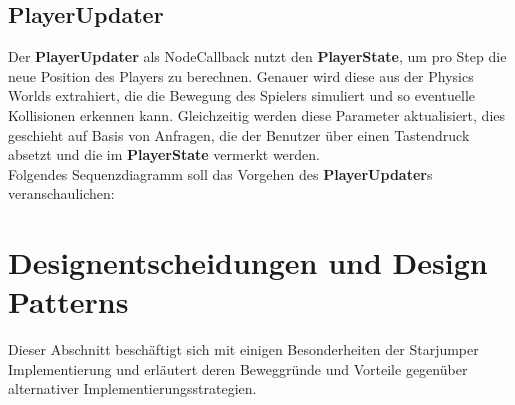 \documentclass{llncs}
\begin{document}
\subsection{PlayerUpdater}
Der \textbf{PlayerUpdater} als NodeCallback nutzt den \textbf{PlayerState}, um pro Step die neue Position des Players
zu berechnen. Genauer wird diese aus der Physics Worlds extrahiert, die die Bewegung des Spielers simuliert und so
eventuelle Kollisionen erkennen kann. Gleichzeitig werden diese Parameter aktualisiert, dies geschieht auf Basis von
Anfragen, die der Benutzer \"uber einen Tastendruck absetzt und die im \textbf{PlayerState} vermerkt werden.\\
Folgendes Sequenzdiagramm soll das Vorgehen des \textbf{PlayerUpdater}s veranschaulichen:

\section{Designentscheidungen und Design Patterns}
Dieser Abschnitt besch\"aftigt sich mit einigen Besonderheiten der Starjumper Implementierung und erl\"autert deren
Beweggr\"unde und Vorteile gegen\"uber alternativer Implementierungsstrategien.
\end{document}
